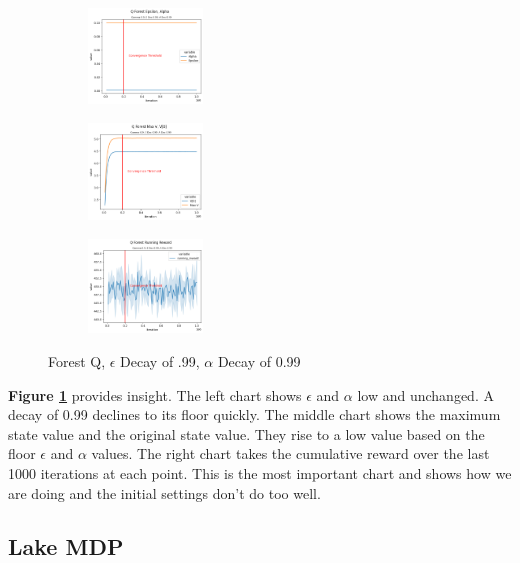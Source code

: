 \documentclass[letterpaper]{article} %
\begin{document}
\begin{figure}[!htb]
	\centering
 	\begin{subfigure}[b]{0.175\textwidth}
		\includegraphics[width=1.2in]{Figures/Q_Forest_Epsilon__Alpha_Gamma_0_9__E_Dec_0_99__A_Dec_0_99.png}
  	\end{subfigure}%
	 \begin{subfigure}[b]{0.175\textwidth}
		\includegraphics[width=1.2in]{Figures/Q_Forest_Max_V__V0_Gamma_0_9__E_Dec_0_99__A_Dec_0_99.png}
  	\end{subfigure}%
	\begin{subfigure}[b]{0.175\textwidth}
		\includegraphics[width=1.2in]{Figures/Q_Forest_Running_Reward_Gamma_0_9__E_Dec_0_99__A_Dec_0_99.png}
  	\end{subfigure}
\caption{Forest Q,  $\epsilon$ Decay of .99, $\alpha$ Decay of 0.99}
\label{fig:forest_q_e_99_a_99_rewards}
\end{figure}

\textbf{Figure \ref{fig:forest_q_e_99_a_99_rewards}} provides insight.  The left chart shows $\epsilon$ and $\alpha$ low and unchanged.  A decay of 0.99 declines to its floor quickly.  The middle chart shows the maximum state value and the original state value.  They rise to a low value based on the floor  $\epsilon$ and $\alpha$ values.  The right chart  takes the cumulative reward over the last 1000 iterations at each point.  This is the most important chart and shows how we are doing and the initial settings don't do too well.


\subsection{Lake MDP} 
\end{document}
